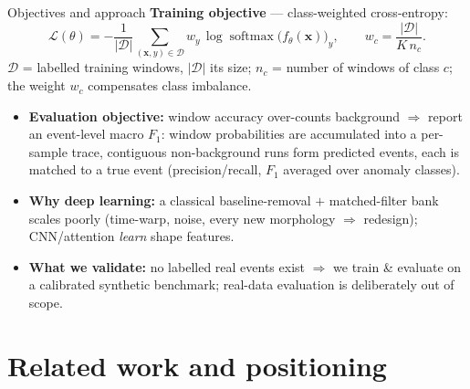\documentclass[11pt, aspectratio=169]{beamer}
\newcommand{\softmax}{\operatorname{softmax}}
\begin{document}
\begin{frame}{Objectives and approach}
  \textbf{Training objective} --- class-weighted cross-entropy:
  \[
    \mathcal{L}(\theta) = -\frac{1}{|\mathcal{D}|}
        \sum_{(\mathbf{x},y)\in\mathcal{D}} w_y \,\log
        \softmax\!\big(f_\theta(\mathbf{x})\big)_y,
    \qquad
    w_c = \frac{|\mathcal{D}|}{K\,n_c}.
  \]
  {\footnotesize $\mathcal{D}$ = labelled training windows, $|\mathcal{D}|$ its
   size; $n_c$ = number of windows of class $c$; the weight $w_c$ compensates
   class imbalance.}
  \vspace{0.3em}
  \begin{itemize}
    \item \textbf{Evaluation objective:} window accuracy over-counts background
          $\Rightarrow$ report an \alert{event-level macro $F_1$}: window
          probabilities are accumulated into a per-sample trace, contiguous
          non-background runs form predicted events, each is matched to a true
          event (precision/recall, $F_1$ averaged over anomaly classes).
    \item \textbf{Why deep learning:} a classical baseline-removal $+$
          matched-filter bank scales poorly (time-warp, noise, every new
          morphology $\Rightarrow$ redesign); CNN/attention \emph{learn} shape
          features.
    \item \textbf{What we validate:} no labelled real events exist $\Rightarrow$
          we train \& evaluate on a \alert{calibrated synthetic benchmark};
          real-data evaluation is deliberately out of scope.
  \end{itemize}
\end{frame}

\section{Related work and positioning}
\end{document}
